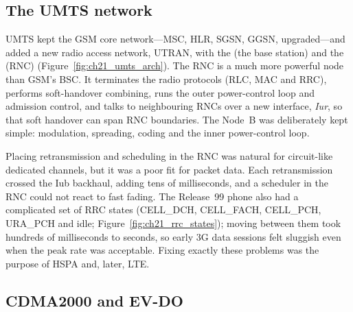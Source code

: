 
\subsection{The UMTS network}

UMTS kept the GSM core network---MSC, HLR, SGSN, GGSN, upgraded---and added a new radio access
network, UTRAN, with the  (the base station) and the 
(RNC) (Figure~\ref{fig:ch21_umts_arch}). The RNC is a much more powerful node than GSM's BSC. It
terminates the radio protocols (RLC, MAC and RRC), performs soft-handover combining, runs the outer
power-control loop and admission control, and talks to neighbouring RNCs over a new interface,
\emph{Iur}, so that soft handover can span RNC boundaries. The Node~B was deliberately kept simple:
modulation, spreading, coding and the inner power-control loop.

Placing retransmission and scheduling in the RNC was natural for circuit-like dedicated channels,
but it was a poor fit for packet data. Each retransmission crossed the Iub backhaul, adding tens of
milliseconds, and a scheduler in the RNC could not react to fast fading. The Release~99 phone also
had a complicated set of RRC states (CELL\_DCH, CELL\_FACH, CELL\_PCH, URA\_PCH and idle;
Figure~\ref{fig:ch21_rrc_states}); moving between them took hundreds of milliseconds to seconds, so
early 3G data sessions felt sluggish even when the peak rate was acceptable. Fixing exactly these
problems was the purpose of HSPA and, later, LTE.


\subsection{CDMA2000 and EV-DO}

